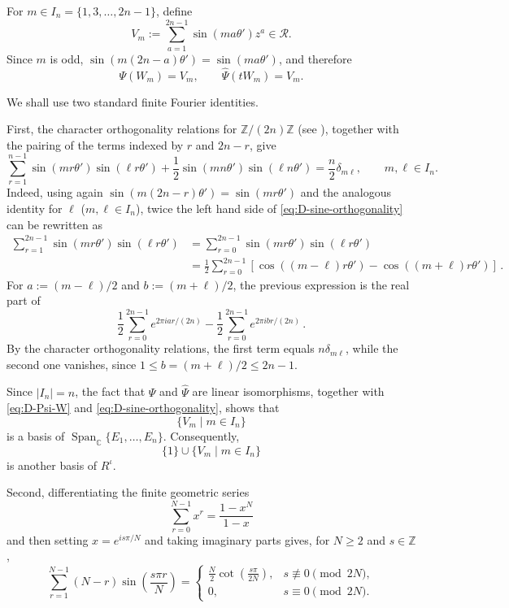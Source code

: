 \documentclass[a4paper,reqno]{amsart}
\theoremstyle{plain} %
\theoremstyle{definition} %
\theoremstyle{remark} %
\newcommand{\1}{\mathds{1}}   %
\begin{document}
For \(m\in I_n =\{1,3,\ldots,2n-1\} \), define
\[
V_m
:=
\sum_{a=1}^{2n-1}
\sin(ma\theta')z^a
\in \mathcal R.
\]
Since \(m\) is odd, $\sin(m(2n-a)\theta')=\sin(ma\theta')$, 
and therefore
\begin{equation}\label{eq:D-Psi-W}
\Psi(W_m)=V_m,
\qquad
\widehat\Psi(tW_m)=V_m.
\end{equation}

We shall use two standard finite Fourier identities. 

First, the character orthogonality relations for
\(\mathbb Z/(2n)\mathbb Z\) (see \cite{Serre77}), together with the pairing of the
terms indexed by \(r\) and \(2n-r\), give
\begin{equation}\label{eq:D-sine-orthogonality}
\sum_{r=1}^{n-1}
\sin(mr\theta')\sin(\ell r\theta')
+
\frac12
\sin(mn\theta')\sin(\ell n\theta')
=
\frac n2\delta_{m\ell},
\qquad
m,\ell\in I_n.
\end{equation}
Indeed, using again $\sin(m(2n-r)\theta')=\sin(mr\theta')$ and the analogous identity for $\ell$ ($m, \ell \in I_n$),
twice the left hand side of \eqref{eq:D-sine-orthogonality} can be rewritten as
\begin{align*}
\sum_{r=1}^{2n-1} \sin(mr\theta')\sin(\ell r\theta') & = \sum_{r=0}^{2n-1} \sin(mr\theta')\sin(\ell r\theta') \\
& =\frac{1}{2} \sum_{r=0}^{2n-1} \left[ \cos ((m-\ell)r\theta') - \cos ((m+\ell)r\theta') \right] \, .
\end{align*}
For $a:= (m-\ell)/2$ and $b:= (m+\ell)/2$, the previous expression is the real part of
\[
\frac{1}{2}\sum_{r=0}^{2n-1} e^{2\pi i a r /(2n)} - \frac{1}{2}\sum_{r=0}^{2n-1} e^{2\pi i b r /(2n)} \, .
\]
By the character orthogonality relations, the first term equals  $n\delta_{m \ell}$,  
while the second one vanishes, since  $1\leq b=(m+\ell)/2 \leq 2n-1$.

Since \(|I_n|=n\), the fact that \(\Psi\) and \(\widehat\Psi\) are linear isomorphisms, together with 
\eqref{eq:D-Psi-W} and \eqref{eq:D-sine-orthogonality}, shows that
\[
\{V_m\mid m\in I_n\}
\]
is a basis of $\operatorname{Span}_{\mathbb C}\{E_1,\ldots,E_n\}$. 
Consequently,
\[
\{1\}\cup\{V_m\mid m\in I_n\}
\]
is another basis of \(R^\iota\).

Second,  differentiating the finite geometric series
\[ 
\sum_{r=0}^{N-1}x^r=\frac{1-x^N}{1-x} 
\]
and then setting \(x=e^{is\pi/N}\) and taking imaginary parts gives, for \(N\ge2\) and \(s\in\mathbb Z\),
\begin{equation}\label{eq:D-weighted-sine}
\sum_{r=1}^{N-1}
(N-r)\sin\left(\frac{s\pi r}{N}\right)
=
\begin{cases}
\displaystyle
\frac N2
\cot\left(\frac{s\pi}{2N}\right),
&
s\not\equiv0\pmod{2N},\\[3mm]
0,
&
s\equiv0\pmod{2N}.
\end{cases}
\end{equation}
\end{document}
